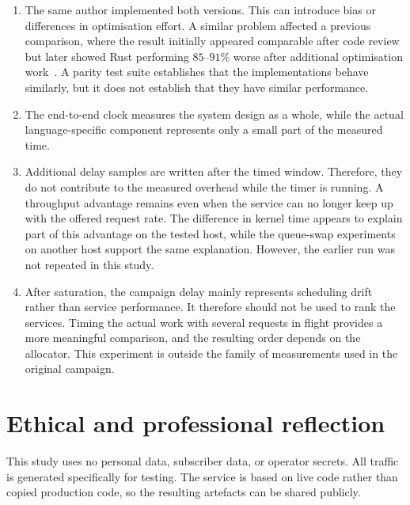 \documentclass[english,oneside,a4paper,censored,csm,software-track-2020]{HYthesisML}
\begin{document}
\begin{enumerate}[label=\textbf{\arabic*.}, leftmargin=1.6em, itemsep=0.6ex, topsep=0.5ex,
  parsep=0pt]
\item The same author implemented both versions. This can introduce bias or differences in
optimisation effort. A similar problem affected a previous comparison, where the result
initially appeared comparable after code review but later showed Rust performing
$85$--$91\%$ worse after additional optimisation work~\cite{emberg2023asn1}. A parity test
suite establishes that the implementations behave similarly, but it does not establish that
they have similar performance.

\item The end-to-end clock measures the system design as a whole, while the actual
language-specific component represents only a small part of the measured time.

\item Additional delay samples are written after the timed window. Therefore, they do not
contribute to the measured overhead while the timer is running. A throughput advantage remains
even when the service can no longer keep up with the offered request rate. The difference in
kernel time appears to explain part of this advantage on the tested host, while the queue-swap
experiments on another host support the same explanation. However, the earlier run was not
repeated in this study.

\item After saturation, the campaign delay mainly represents scheduling drift rather than
service performance. It therefore should not be used to rank the services. Timing the actual
work with several requests in flight provides a more meaningful comparison, and the resulting
order depends on the allocator. This experiment is outside the family of measurements used in
the original campaign.
\end{enumerate}

\section{Ethical and professional reflection}
This study uses no personal data, subscriber data, or operator secrets. All
traffic is generated specifically for testing. The service is based on live
code rather than copied production code, so the resulting artefacts can be
shared publicly.
\end{document}
